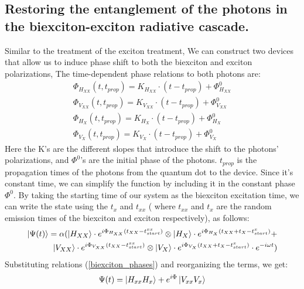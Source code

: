 \subsection{Restoring the entanglement of the photons in the biexciton-exciton radiative cascade.}

Similar to the treatment of the exciton treatment, We can construct two devices that allow us to induce phase shift to both the biexciton and exciton polarizations, The time-dependent phase relations to both photons are: 
\begin{equation} \label{biexciton_phases}
\begin{aligned} 
		&\Phi_{H_{XX}}{(t,t_{prop})} = K_{H_{XX}}\cdot(t-t_{prop}) + \Phi^0_{H_{XX}} & \\	&\Phi_{V_{XX}}{(t,t_{prop})} = K_{V_{XX}}\cdot(t-t_{prop}) + \Phi^0_{V_{XX}} \\
        &\Phi_{H_{X}}{(t,t_{prop})} = K_{H_{X}}\cdot(t-t_{prop}) + \Phi^0_{H_{X}} &\\
		&\Phi_{V_{X}}{(t,t_{prop})} = K_{V_{X}}\cdot(t-t_{prop}) + \Phi^0_{V_{X}} 
\end{aligned}
\end{equation}
Here the K's are the different slopes that introduce the shift to the photons' polarizations, and  $\Phi^0$'s are the initial phase of the photons. $t_{prop}$ is the propagation times of the photons from the quantum dot to the device. Since it's constant time, we can simplify the function by including it in the constant phase $\Phi^0$.
By taking the starting time of our system as the biexciton excitation time, we can write the state using the $t_x$ and $t_{xx}$ ( where $t_{xx}$ and $t_{x}$ are the random emission times of the biexciton and exciton respectively), as follows:
\begin{equation}
\begin{split}
		\ket{\Psi(t)}= \alpha(\ket{H_{XX}}\cdot e^{i\Phi_{H_{XX}}(t_{XX}-t^{xx}_{start})} \otimes 
		\ket{H_{X}}\cdot e^{i\Phi_{H_{X}}(t_{XX}+t_{X}-t^{x}_{start})}+\\
        \ket{V_{XX}}\cdot e^{i\Phi_{V_{XX}}(t_{XX}-t^{xx}_{start})} \otimes 
		\ket{V_{X}}\cdot e^{i\Phi_{V_{X}}(t_{XX}+t_{X}-t^{x}_{start})}\cdot e^{-i\omega t})	
  \end{split}
\end{equation} 
Substituting relations (\ref{biexciton_phases}) and reorganizing the terms, we get:
\begin{equation}
	\Psi(t) = \ket{H_{xx}H_x}+e^{i\Phi}\ket{V_{xx}V_x}
\end{equation}
